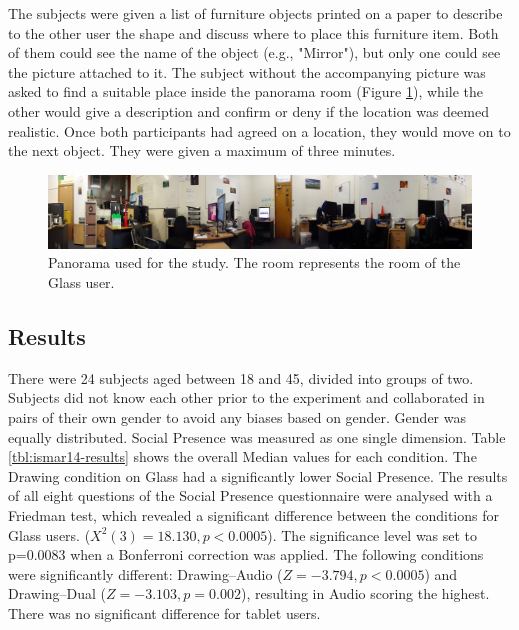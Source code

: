 The subjects were given a list of furniture objects printed on a paper to describe to the other user the shape and discuss where to place this furniture item. Both of them could see the name of the object (e.g., "Mirror"), but only one could see the picture attached to it. The subject without the accompanying picture was asked to find a suitable place inside the panorama room (Figure \ref{fig:ismar14:envrionment-setup}), while the other would give a description and confirm or deny if the location was deemed realistic. Once both participants had agreed on a location, they would move on to the next object. They were given a maximum of three minutes.

\begin{figure}[ht]
	\centering
	\includegraphics[width=\linewidth]{images/ismar14/envrionment-setup}
	\caption{Panorama used for the study. The room represents the room of the Glass user.}
	\label{fig:ismar14:envrionment-setup}
\end{figure}

\subsection{Results}

There were 24 subjects aged between 18 and 45, divided into groups of two. Subjects did not know each other prior to the experiment and collaborated in pairs of their own gender to avoid any biases based on gender. Gender was equally distributed. Social Presence was measured as one single dimension. Table \ref{tbl:ismar14-results} shows the overall Median values for each condition. The Drawing condition on Glass had a significantly lower Social Presence. The results of all eight questions of the Social Presence questionnaire were analysed with a Friedman test, which revealed a significant difference between the conditions for Glass users. ($X^2(3)=18.130, p<0.0005$). The significance level was set to p=0.0083 when a Bonferroni correction was applied. The following conditions were significantly different: Drawing–Audio ($Z=-3.794, p<0.0005$) and Drawing–Dual ($Z=-3.103, p=0.002$), resulting in Audio scoring the highest. There was no significant difference for tablet users.

